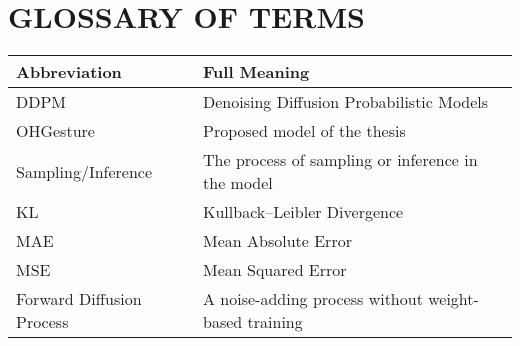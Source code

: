 \pagebreak
{}
{}
\section*{\textbf{ \Large GLOSSARY OF TERMS}}

\begin{center}
\begin{tabular}{|p{5cm}|p{10cm}|}
\hline
\textbf{Abbreviation} & \textbf{Full Meaning} \\
\hline
DDPM & Denoising Diffusion Probabilistic Models \\
\hline
OHGesture & Proposed model of the thesis \\
\hline
Sampling/Inference & The process of sampling or inference in the model \\
\hline
KL & Kullback–Leibler Divergence \\
\hline
MAE & Mean Absolute Error \\
\hline
MSE & Mean Squared Error \\
\hline
Forward Diffusion Process & A noise-adding process without weight-based training \\
\hline
\end{tabular}
\end{center}

\pagebreak
